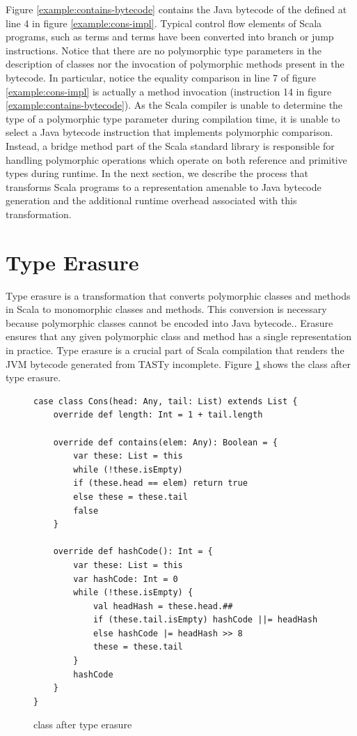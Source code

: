 Figure \ref{example:contains-bytecode} contains the Java bytecode of the  defined at line 4 in figure \ref{example:cons-impl}.
Typical control flow elements of Scala programs, such as  terms and  terms have been converted into branch or jump instructions.
Notice that there are no polymorphic type parameters in the description of classes nor the invocation of polymorphic methods present in the bytecode.
In particular, notice the equality comparison in line 7 of figure \ref{example:cons-impl} is actually a method invocation (instruction 14 in figure \ref{example:contains-bytecode}).
As the Scala compiler is unable to determine the type of a polymorphic type parameter during compilation time, it is unable to select a Java bytecode instruction that implements polymorphic comparison.
Instead, a bridge method part of the Scala standard library is responsible for handling polymorphic operations which operate on both reference and primitive types during runtime.
In the next section, we describe the process that transforms Scala programs to a representation amenable to Java bytecode generation and the additional runtime overhead associated with this transformation.

\section{Type Erasure}
\label{background:type-erasure}

Type erasure\cite{java:generics} is a transformation that converts polymorphic classes and methods in Scala to monomorphic classes and methods. 
This conversion is necessary because polymorphic classes cannot be encoded into Java bytecode..
Erasure ensures that any given polymorphic class and method has a single representation in practice.
Type erasure is a crucial part of Scala compilation that renders the JVM bytecode generated from TASTy incomplete.
Figure \ref{example:erase-cons} shows the  class after type erasure.

\begin{figure}[!htb]
\begin{verbatim}
case class Cons(head: Any, tail: List) extends List {
	override def length: Int = 1 + tail.length
		
	override def contains(elem: Any): Boolean = {
		var these: List = this
		while (!these.isEmpty) 
		if (these.head == elem) return true
		else these = these.tail
		false
	}
		
	override def hashCode(): Int = {
		var these: List = this
		var hashCode: Int = 0
		while (!these.isEmpty) {
			val headHash = these.head.##
			if (these.tail.isEmpty) hashCode ||= headHash
			else hashCode |= headHash >> 8
			these = these.tail	
		}
		hashCode
	}
}		
\end{verbatim}
\caption{ class after type erasure}
\label{example:erase-cons}
\end{figure}

